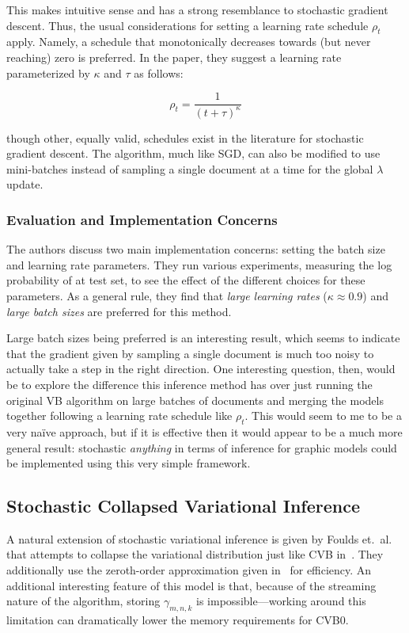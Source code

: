 \documentclass[11pt]{article}
\begin{document}
This makes intuitive sense and has a strong resemblance to stochastic
gradient descent. Thus, the usual considerations for setting a learning
rate schedule $\rho_t$ apply. Namely, a schedule that monotonically
decreases towards (but never reaching) zero is preferred. In the paper,
they suggest a learning rate parameterized by $\kappa$ and $\tau$ as
follows:

\begin{equation}
  \rho_t = \frac{1}{(t+\tau)^\kappa}
\end{equation}

though other, equally valid, schedules exist in the literature for
stochastic gradient descent. The algorithm, much like SGD, can also be
modified to use mini-batches instead of sampling a single document at a
time for the global $\lambda$ update.

\subsubsection{Evaluation and Implementation Concerns}

The authors discuss two main implementation concerns: setting the batch
size and learning rate parameters. They run various experiments, measuring
the log probability of at test set, to see the effect of the different
choices for these parameters. As a general rule, they find that \emph{large
learning rates} ($\kappa \approx 0.9$) and \emph{large batch sizes} are
preferred for this method.

Large batch sizes being preferred is an interesting result, which seems to
indicate that the gradient given by sampling a single document is much too
noisy to actually take a step in the right direction. One interesting
question, then, would be to explore the difference this inference method
has over just running the original VB algorithm on large batches of
documents and merging the models together following a learning rate
schedule like $\rho_t$. This would seem to me to be a very na\"ive
approach, but if it is effective then it would appear to be a much more
general result: stochastic \emph{anything} in terms of inference for
graphic models could be implemented using this very simple framework.

\subsection{Stochastic Collapsed Variational Inference}
A natural extension of stochastic variational inference is given by Foulds
et.\ al.~\cite{Foulds:2013:scvb} that attempts to collapse the variational
distribution just like CVB in~\cite{Teh:2007:CVB}. They additionally use
the zeroth-order approximation given in~\cite{Asuncion:2009:onsmoothing}
for efficiency. An additional interesting feature of this model is that,
because of the streaming nature of the algorithm, storing $\gamma_{m,n,k}$
is impossible---working around this limitation can dramatically lower the
memory requirements for CVB0.
\end{document}
